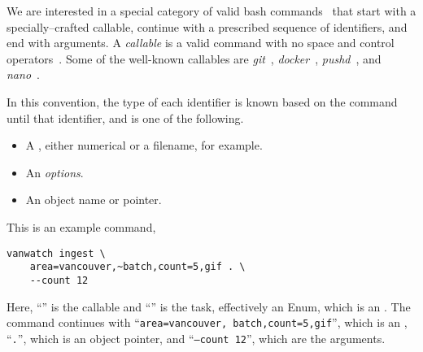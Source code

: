 We are interested in a special category of valid bash commands~\cite{shell_syntax} that start with a specially--crafted callable, continue with a prescribed sequence of identifiers, and end with arguments. 
A \emph{callable} is a valid command with no space and control operators~\cite{control_operators}. Some of the well-known callables are \emph{git}~\cite{git}, \emph{docker}~\cite{docker}, \emph{pushd}~\cite{pushd}, and \emph{nano}~\cite{nano}. 

In this convention, the type of each identifier is known based on the command until that identifier, and is one of the following.
%
\begin{itemize}
    \item A , either numerical or a filename, for example.
    \item An \emph{options}.
    \item An object name or pointer.
\end{itemize}
%
This is an example command,
%
\begin{verbatim}
vanwatch ingest \
    area=vancouver,~batch,count=5,gif . \
    --count 12
\end{verbatim}
%
Here, ``'' is the callable and ``'' is the task, effectively an Enum, which is an . The command continues with ``\texttt{area=vancouver,~batch,count=5,gif}'', which is an , ``\texttt{.}'', which is an object pointer, and ``\texttt{--count 12}'', which are the arguments.